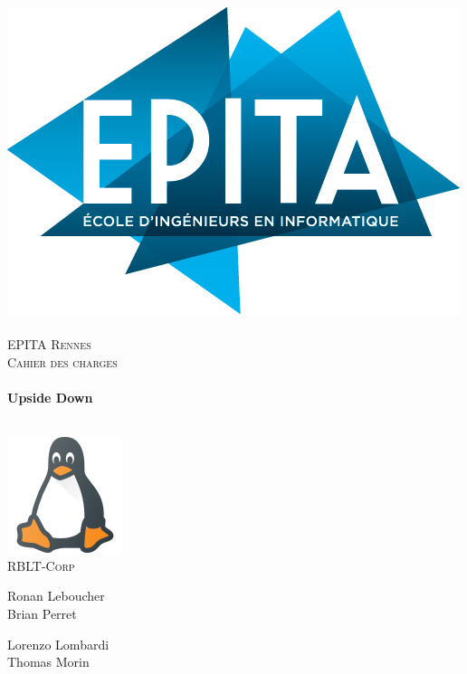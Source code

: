 
\begin{titlepage}
  \begin{sffamily}
  \begin{center}

  
    \includegraphics[scale=0.3]{pictures/logo}~\\[1.5cm]

    \textsc{\LARGE EPITA Rennes}\\[0.5cm]

    \textsc{\Large Cahier des charges}\\[1.5cm]

    \HRule \\[0.4cm]
     { \huge \bfseries Upside Down \\[0.4cm] }

    \HRule \\[2cm]
    \includegraphics[scale=0.6]{pictures/linux}
     \\[0.5cm]
    \textsc{\Large RBLT-Corp}\\[1.5cm]

    \begin{minipage}{0.4\textwidth}
      \begin{flushleft} \large
        Ronan Leboucher\\
        Brian Perret\\
      \end{flushleft}
    \end{minipage}
    \begin{minipage}{0.4\textwidth}
      \begin{flushright} \large
        Lorenzo Lombardi\\
        Thomas Morin\\
      \end{flushright}
    \end{minipage}


\end{center}
\end{sffamily}
\end{titlepage}
